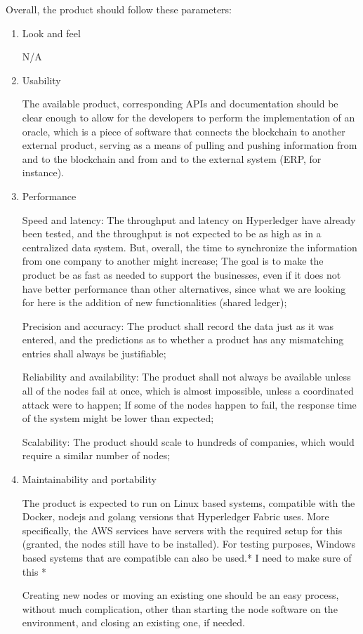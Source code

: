 Overall, the product should follow these parameters:
\begin{enumerate}
	\item Look and feel
		\par N/A
    \item  Usability
		\par The available product, corresponding APIs  and documentation should be clear enough to allow for the developers to perform the implementation of an oracle, which is a piece of software that connects the blockchain to another external product, serving as a means of pulling and pushing information from and to the blockchain and from and to the external system (ERP, for instance).
    \item  Performance
		\par Speed and latency: The throughput and latency on Hyperledger have already been tested, and the throughput is not expected to be as high as in a centralized data system. But, overall, the time to synchronize the information from one company to another might increase; The goal is to make the product be as fast as needed to support the businesses, even if it does not have better performance than other alternatives, since what we are looking for here is the addition of new functionalities (shared ledger);
		\par Precision and accuracy: The product shall record the data just as it was entered, and the predictions as to whether a product has any mismatching entries shall always be justifiable;
		\par Reliability and availability: The product shall not always be available unless all of the nodes fail at once, which is almost impossible, unless a coordinated attack were to happen; If some of the nodes happen to fail, the response time of the system might be lower than expected;
		\par Scalability: The product should scale to hundreds of companies, which would require a similar number of nodes;
    \item  Maintainability and portability
		\par The product is expected to run on Linux based systems, compatible with the Docker, nodejs and golang versions that Hyperledger Fabric uses. More specifically, the AWS services have servers with the required setup for this (granted, the nodes still have to be installed). For testing purposes, Windows based systems that are compatible can also be used.* I need to make sure of this *
		\par Creating new nodes or moving an existing one should be an easy process, without much complication, other than starting the node software on the environment, and closing an existing one, if needed.

\end{enumerate}
